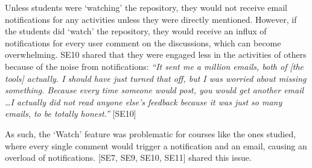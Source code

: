 Unless students were `watching' the repository, they would not receive email notifications for any activities unless they were directly mentioned. However, if the students did `watch' the repository, they would receive an influx of notifications for every user comment on the discussions, which can become overwhelming. SE10 shared that they were engaged less in the activities of others because of the noise from notifications: \textit{``It sent me a million emails, both of [the tools] actually. I should have just turned that off, but I was worried about missing something. Because every time someone would post, you would get another email \ldots I actually did not read anyone else's feedback because it was just so many emails, to be totally honest.''} [SE10]

As such, the `Watch' feature was problematic for courses like the ones studied, where every single comment would trigger a notification and an email, causing an overload of notifications. [SE7, SE9, SE10, SE11] shared this issue.







